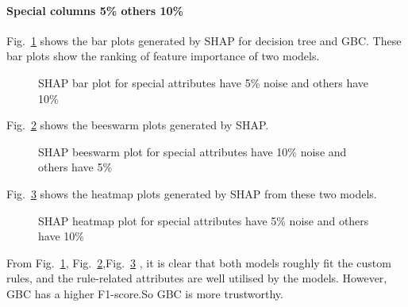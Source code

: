 \documentclass[runningheads,a4paper]{llncs}
\begin{document}
\paragraph{Special columns 5\% others 10\%}
Fig.~\ref{bar plots special_lower 10} shows the bar plots generated by SHAP for decision tree and GBC. These bar plots show the ranking of feature importance of two models.
\begin{figure}[H]
	\centering
	
	\hfill
	
	
	\caption{SHAP bar plot for special attributes have 5\% noise and others have 10\% }
	\label{bar plots special_lower 10}
\end{figure}
Fig.~\ref{bee plots special_lower 10} shows the beeswarm plots generated by SHAP.
\begin{figure}[H]
	\centering
	
	\hfill
	
	
	\caption{SHAP beeswarm plot for special attributes have 10\% noise and others have 5\% }
	\label{bee plots special_lower 10}
	
\end{figure}
Fig.~\ref{heat plots special_lower 10} shows the heatmap plots generated by SHAP from these two models.
\begin{figure}[H]
	\centering
	
	\hfill
	
	
	\caption{SHAP heatmap plot for special attributes have 5\% noise and others have 10\%}
	\label{heat plots special_lower 10}
	
\end{figure}

From Fig.~\ref{bar plots special_lower 10}, Fig.~\ref{bee plots special_lower 10},Fig.~\ref{heat plots special_lower 10} , it is clear that both models roughly fit the custom rules, and the rule-related attributes are well utilised by the models. However, GBC has a higher F1-score.So GBC is more trustworthy.
\end{document}
